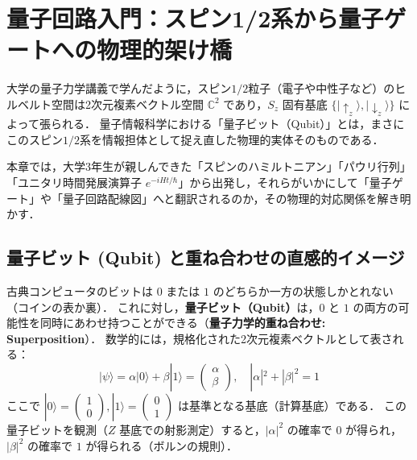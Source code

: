 \documentclass[11pt,a4paper,oneside,openany]{ltjsbook}
\theoremstyle{definition}
\theoremstyle{plain}
\theoremstyle{remark}
\newcommand{\ket}[1]{|#1\rangle}
\begin{document}
\chapter{量子回路入門：スピン1/2系から量子ゲートへの物理的架け橋}
\label{sec:quantum_circuits_intro}

大学の量子力学講義で学んだように，スピン$1/2$粒子（電子や中性子など）のヒルベルト空間は2次元複素ベクトル空間 $\mathbb{C}^2$ であり，$S_z$ 固有基底 $\{\ket{\uparrow_z}, \ket{\downarrow_z}\}$ によって張られる．
量子情報科学における「量子ビット（Qubit）」とは，まさにこのスピン$1/2$系を情報担体として捉え直した物理的実体そのものである\cite{nielsen2010quantum}．

本章では，大学3年生が親しんできた「スピンのハミルトニアン」「パウリ行列」「ユニタリ時間発展演算子 $e^{-i H t / \hbar}$」から出発し，それらがいかにして「量子ゲート」や「量子回路配線図」へと翻訳されるのか，その物理的対応関係を解き明かす\cite{barenco1995elementary}．

\section{量子ビット (Qubit) と重ね合わせの直感的イメージ}
古典コンピュータのビットは $0$ または $1$ のどちらか一方の状態しかとれない（コインの表か裏）．
これに対し，\textbf{量子ビット（Qubit）}は，$0$ と $1$ の両方の可能性を同時にあわせ持つことができる（\textbf{量子力学的重ね合わせ: Superposition}）．
数学的には，規格化された2次元複素ベクトルとして表される：
\begin{equation}
    \ket{\psi} = \alpha \ket{0} + \beta \ket{1} = \begin{pmatrix} \alpha \\ \beta \end{pmatrix}, \quad |\alpha|^2 + |\beta|^2 = 1
\end{equation}
ここで $\ket{0} = \begin{pmatrix} 1 \\ 0 \end{pmatrix}, \ket{1} = \begin{pmatrix} 0 \\ 1 \end{pmatrix}$ は基準となる基底（計算基底）である．
この量子ビットを観測（$Z$ 基底での射影測定）すると，$|\alpha|^2$ の確率で $0$ が得られ，$|\beta|^2$ の確率で $1$ が得られる（ボルンの規則）．
\end{document}
